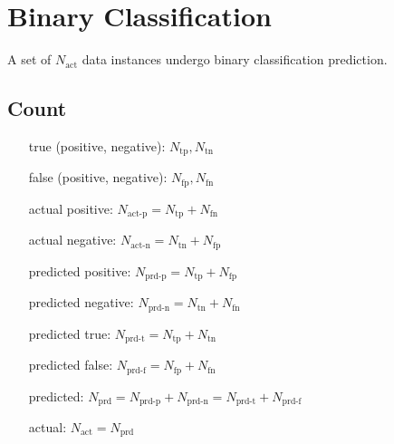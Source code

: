 \section*{Binary Classification}
A set of $N_{\text{act}}$ data instances undergo binary classification
prediction. 

\subsection*{Count}

\begin{itemize}
\item [true (positive, negative):] $N_{\text{tp}}, N_{\text{tn}}$
\item [false (positive, negative):] $N_{\text{fp}}, N_{\text{fn}}$
\item [actual positive:] $N_{\text{act-p}} = N_{\text{tp}} + N_{\text{fn}}$
\item [actual negative:] $N_{\text{act-n}} = N_{\text{tn}} + N_{\text{fp}}$
\item [predicted positive:] $N_{\text{prd-p}} = N_{\text{tp}} + N_{\text{fp}}$
\item [predicted negative:] $N_{\text{prd-n}} = N_{\text{tn}} + N_{\text{fn}}$
\item [predicted true:] $N_{\text{prd-t}} = N_{\text{tp}} + N_{\text{tn}}$
\item [predicted false:] $N_{\text{prd-f}} = N_{\text{fp}} + N_{\text{fn}}$
\item [predicted:] $N_{\text{prd}} = N_{\text{prd-p}} + N_{\text{prd-n}} =
  N_{\text{prd-t}} + N_{\text{prd-f}}$
\item [actual:] $N_{\text{act}} = N_{\text{prd}}$
\end{itemize}

